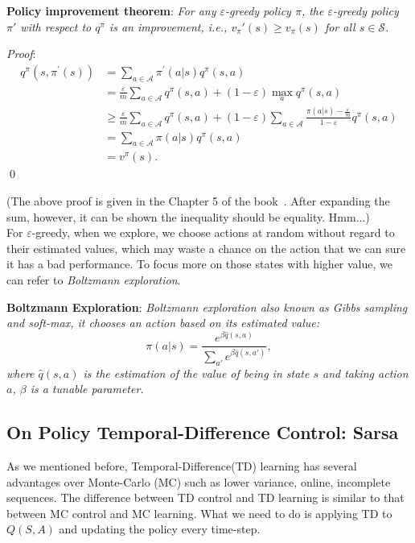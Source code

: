 \documentclass{progartcn}
\begin{document}
			\textbf{Policy improvement theorem}: \textit{For any $\varepsilon$-greedy policy $\pi$, the $\varepsilon$-greedy policy $\pi'$ with respect to $q^\pi$ is an improvement, i.e., $v_\pi'(s)\ge v_\pi(s)$ for all $s\in\mathcal{S}$.}

			\textit{Proof}:
			\begin{align*}
			q^{\pi}\left(s, \pi^{\prime}(s)\right) &=\sum_{a \in \mathcal{A}} \pi^{\prime}(a | s) q^{\pi}(s, a) \\
			&=\frac{\varepsilon}{m} \sum_{a \in \mathcal{A}} q^{\pi}(s, a)+(1-\varepsilon) \max _{a} q^{\pi}(s, a) \\
			& \geq \frac{\varepsilon}{m} \sum_{a \in \mathcal{A}} q^{\pi}(s, a)+(1-\varepsilon) \sum_{a \in \mathcal{A}} \frac{\pi(a | s)-\frac{\varepsilon}{m}}{1-\varepsilon} q^{\pi}(s, a) \tag{1}\\
			&=\sum_{a \in \mathcal{A}} \pi(a | s) q^{\pi}(s, a)\\
			&=v^{\pi}(s).
			\end{align*}
			\qed

			(The above proof is given in the Chapter 5 of the book~\cite{sutton2018reinforcement}. After expanding the sum, however, it can be shown the inequality should be equality. Hmm...)\\

			For $\varepsilon$-greedy, when we explore, we choose actions at random without regard to their estimated values, which may waste a chance on the action that we can sure it has a bad performance. To focus more on those states with higher value, we can refer to \textit{Boltzmann exploration}.

			\textbf{Boltzmann Exploration}: \textit{Boltzmann exploration also known as Gibbs sampling and soft-max, it chooses an action based on its estimated value:}
			\[\pi(a|s)=\frac{e^{\beta\hat q(s,a)}}{\sum_{a'}e^{\beta\hat q(s,a')}},\]
			\textit{where $\hat q(s,a)$ is the estimation of the value of being in state $s$ and taking action $a$, $\beta$ is a tunable parameter.}\\

	\subsection{On Policy Temporal-Difference Control: Sarsa}

			As we mentioned before, Temporal-Difference(TD) learning has several advantages over Monte-Carlo (MC) such as lower variance, online, incomplete sequences. The difference between TD control and TD learning is similar to that between MC control and MC learning. What we need to do is applying TD to $Q(S,A)$ and updating the policy every time-step.\\
\end{document}
